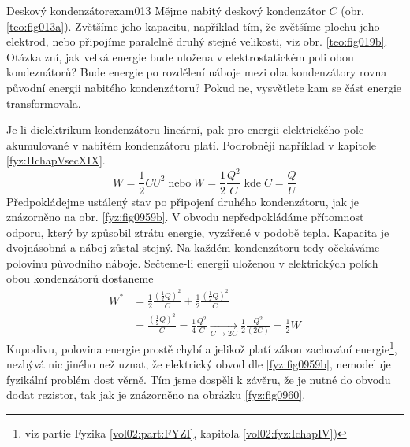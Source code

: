 \begin{fyzexam}{Deskový kondenzátor}{exam013}
  Mějme nabitý deskový kondenzátor \(C\) (obr. \ref{teo:fig013a}). Zvětšíme jeho kapacitu, například
  tím, že zvětšíme plochu jeho elektrod, nebo připojíme paralelně druhý stejné velikosti, viz obr.
  \ref{teo:fig019b}. Otázka zní, jak velká energie bude uložena v elektrostatickém poli obou
  kondeznátorů? Bude energie po rozdělení náboje mezi oba kondenzátory rovna původní energii
  nabitého kondenzátoru? Pokud ne, vysvětlete kam se část energie transformovala. 
  
  {\centering
    \vspace{1em}
    \captionsetup{type=figure, skip=1pt}
    \hfill
    \label{fyz:fig0959}
  \par}

  Je-li dielektrikum kondenzátoru lineární, pak pro energii elektrického pole akumulované v
  nabitém kondenzátoru platí. Podrobněji například v kapitole \ref{fyz:IIchapVsecXIX}.
  \begin{equation}
    W = \frac{1}{2}CU^2 \;\text{nebo}\; W = \frac{1}{2}\frac{Q^2}{C} \;\text{kde}\; 
    C = \frac{Q}{U}
  \end{equation}
  Předpokládejme ustálený stav po připojení druhého kondenzátoru, jak je znázorněno na obr.
  \ref{fyz:fig0959b}. V obvodu nepředpokládáme přítomnost odporu, který by způsobil ztrátu energie,
  vyzářené v podobě tepla. Kapacita je dvojnásobná a náboj zůstal stejný. Na každém kondenzátoru
  tedy očekáváme polovinu původního náboje. Sečteme-li energii uloženou v elektrických polích obou
  kondenzátorů dostaneme
  \begin{align*}
    W^* &= \frac{1}{2}\frac{(\frac{1}{2}Q)^2}{C} + \frac{1}{2}\frac{(\frac{1}{2}Q)^2}{C}   \\
        &= \frac{(\frac{1}{2}Q)^2}{C} =\frac{1}{4}\frac{Q^2}{C}                 
          \xrightarrow[C\rightarrow2C]{}
          \frac{1}{2}\frac{Q^2}{(2C)} = \frac{1}{2}W 
  \end{align*}
  Kupodivu, polovina energie prostě chybí a jelikož platí zákon zachování energie\footnote{viz
  partie Fyzika \ref{vol02:part:FYZI}, kapitola \ref{vol02:fyz:IchapIV})}, nezbývá nic jiného než
  uznat, že elektrický obvod dle \ref{fyz:fig0959b}, nemodeluje fyzikální problém dost věrně. Tím
  jsme dospěli k závěru, že je nutné do obvodu dodat rezistor, tak jak je znázorněno na obrázku
  \ref{fyz:fig0960}.
  

\end{fyzexam}
